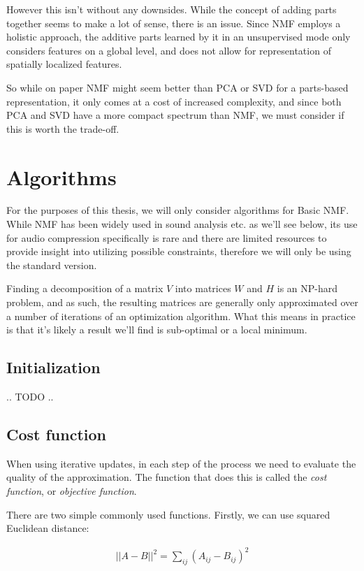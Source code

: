 However this isn't without any downsides. While the concept of adding parts together seems to make a lot of sense, there is an issue. Since NMF employs a holistic approach, the additive parts learned by it in an unsupervised mode only considers features on a global level, and does not allow for representation of spatially localized features. \cite{li_spatial_lnmf_2001}

So while on paper NMF might seem better than PCA or SVD for a parts-based representation, it only comes at a cost of increased complexity, and since both PCA and SVD have a more compact spectrum than NMF, we must consider if this is worth the trade-off. \cite{wang_zhang_2013}

\section{Algorithms}
For the purposes of this thesis, we will only consider algorithms for Basic NMF. While NMF has been widely used in sound analysis etc. as we'll see below, its use for audio compression specifically is rare and there are limited resources to provide insight into utilizing possible constraints, therefore we will only be using the standard version.

Finding a decomposition of a matrix $V$ into matrices $W$ and $H$ is an NP-hard problem, and as such, the resulting matrices are generally only approximated over a number of iterations of an optimization algorithm. What this means in practice is that it's likely a result we'll find is sub-optimal or a local minimum.

\subsection{Initialization}
.. TODO ..

\subsection{Cost function}
When using iterative updates, in each step of the process we need to evaluate the quality of the approximation. The function that does this is called the \emph{cost function}, or \emph{objective function}.

There are two simple commonly used functions. Firstly, we can use squared Euclidean distance: \cite{pentti_pmf_1997}

\begin{align}
||A-B||^2 = \sum_{ij}(A_{ij} - B_{ij})^2
\end{align}

